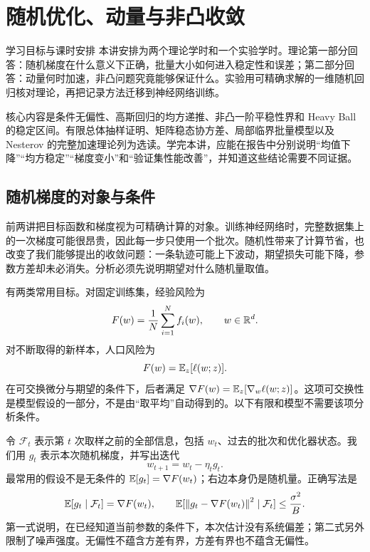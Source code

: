 \chapter{随机优化、动量与非凸收敛}
\label{l3:chapter}

\begin{coursebox}{学习目标与课时安排}
本讲安排为两个理论学时和一个实验学时。理论第一部分回答：随机梯度在什么意义下正确，批量大小如何进入稳定性和误差；第二部分回答：动量何时加速，非凸问题究竟能够保证什么。实验用可精确求解的一维随机回归核对理论，再把记录方法迁移到神经网络训练。

核心内容是条件无偏性、高斯回归的均方递推、非凸一阶平稳性界和 Heavy Ball 的稳定区间。有限总体抽样证明、矩阵稳态协方差、局部临界批量模型以及 Nesterov 的完整加速理论列为选读。学完本讲，应能在报告中分别说明“均值下降”“均方稳定”“梯度变小”和“验证集性能改善”，并知道这些结论需要不同证据。
\end{coursebox}

\section{随机梯度的对象与条件}
\label{l3:stochastic-model}

前两讲把目标函数和梯度视为可精确计算的对象。训练神经网络时，完整数据集上的一次梯度可能很昂贵，因此每一步只使用一个批次。随机性带来了计算节省，也改变了我们能够提出的收敛问题：一条轨迹可能上下波动，期望损失可能下降，参数方差却未必消失。分析必须先说明期望对什么随机量取值。

有两类常用目标。对固定训练集，经验风险为
\begin{equation}
 F(w)=\frac{1}{N}\sum_{i=1}^{N}f_i(w),\qquad w\in\mathbb R^d.
 \label{l3:finite-sum}
\end{equation}
对不断取得的新样本，人口风险为
\begin{equation}
 F(w)=\mathbb E_z[\ell(w;z)].
 \label{l3:population}
\end{equation}
在可交换微分与期望的条件下，后者满足
$\nabla F(w)=\mathbb E_z[\nabla_w\ell(w;z)]$。这项可交换性是模型假设的一部分，不是由“取平均”自动得到的。以下有限和模型不需要该项分析条件。

令 $\mathcal F_t$ 表示第 $t$ 次取样之前的全部信息，包括 $w_t$、过去的批次和优化器状态。我们用 $g_t$ 表示本次随机梯度，并写出迭代
\begin{equation}
 w_{t+1}=w_t-\eta_t g_t.
 \label{l3:sgd}
\end{equation}
最常用的假设不是无条件的 $\mathbb E[g_t]=\nabla F(w_t)$；右边本身仍是随机量。正确写法是
\begin{equation}
 \mathbb E[g_t\mid\mathcal F_t]=\nabla F(w_t),\qquad
 \mathbb E[\left\lVert g_t-\nabla F(w_t)\right\rVert^2\mid\mathcal F_t]\leq\frac{\sigma^2}{B}.
 \label{l3:unbiased-variance}
\end{equation}
第一式说明，在已经知道当前参数的条件下，本次估计没有系统偏差；第二式另外限制了噪声强度。无偏性不蕴含方差有界，方差有界也不蕴含无偏性。

